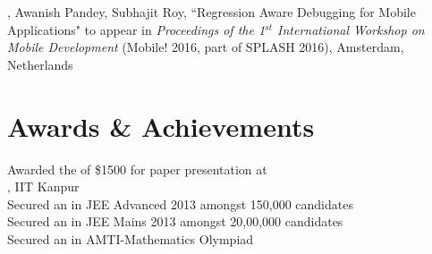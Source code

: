 \documentclass[mm]{simple_style}
\begin{document}
\begin{resume}
, Awanish Pandey, Subhajit Roy, ``Regression Aware Debugging for Mobile Applications" to appear in \textit{Proceedings of the 1$^{st}$ International Workshop on Mobile Development} (Mobile! 2016, part of SPLASH 2016), Amsterdam, Netherlands

\sectionline
\section{Awards \& Achievements}
Awarded the  of \$1500 for paper presentation at \\
, IIT Kanpur\\
Secured an  in JEE Advanced 2013 amongst 150,000 candidates\\
Secured an  in JEE Mains 2013 amongst 20,00,000 candidates\\
Secured an  in AMTI-Mathematics Olympiad\\
\sectionline


\end{resume}
\end{document}
